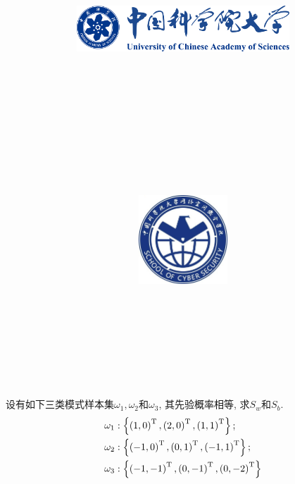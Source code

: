 \documentclass{article}
\title{
	\includegraphics[width=0.6\textwidth]{images/title/ucas_logo 1.pdf}\\
    \vspace{1in}
    \textmd{\textbf{\hmwkClass}}\\
	\textmd{\Large{\textbf{\hmwkClassID}}}\\
    \textmd{\textbf{\hmwkTitle}}\\
    \normalsize\vspace{0.1in}\large{\hmwkCompleteTime }\\
    \vspace{0.1in}\large{\textit{\hmwkClassInstructor\ }}\\
    \vspace{1in}
	\includegraphics[width=0.25\textwidth]{images/title/Cyber.jpg}\\
	\vspace{1in}
}
\author{
	\hmwkAuthorName \\ 
	\hmwkAuthorStuID \\
	\hmwkAuthorInst \\
	\hmwkAuthorzhuanye \\
	\hmwkAuthorfangxiang
	}
\date{}
\begin{document}
\maketitle


%
%
%
%
%


\pagebreak

\begin{homeworkProblem}
	设有如下三类模式样本集$\omega_1,\omega_2$和$\omega_3$, 其先验概率相等, 求$S_w$和$S_b$.
	\begin{align}
		\omega _1&: \left\{ \left( 1,0 \right) ^{\mathrm{T}},\left( 2,0 \right) ^{\mathrm{T}},\left( 1,1 \right) ^{\mathrm{T}} \right\} ; \notag
		\\
		\omega _2&: \left\{ \left( -1,0 \right) ^{\mathrm{T}},\left( 0,1 \right) ^{\mathrm{T}},\left( -1,1 \right) ^{\mathrm{T}} \right\} ; \notag
		\\
		\omega _3&: \left\{ \left( -1,-1 \right) ^{\mathrm{T}},\left( 0,-1 \right) ^{\mathrm{T}},\left( 0,-2 \right) ^{\mathrm{T}} \right\} \notag
	\end{align}


\end{homeworkProblem}
\end{document}
